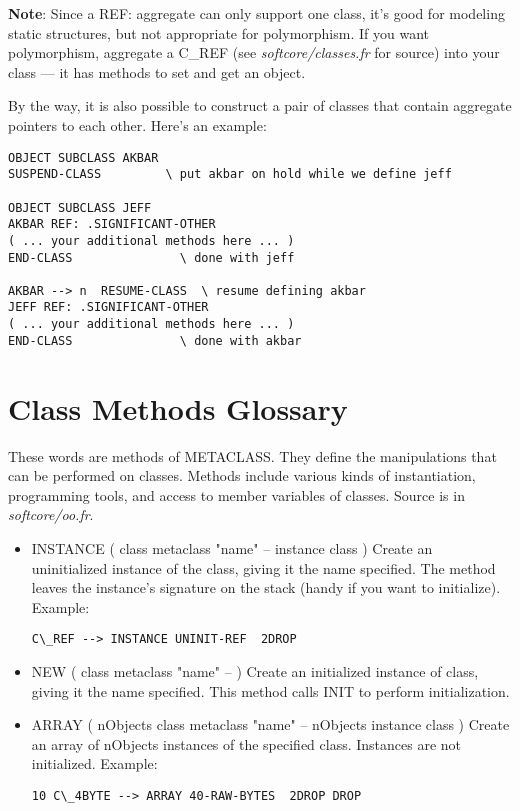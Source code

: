 \begin{;stlisting}[frame=single]
\begin{itemize}[noitemsep]
	\textbf{Note}: Since a REF: aggregate can only support one class,
	it's good for modeling static structures, but not appropriate
	for polymorphism. If you want polymorphism, aggregate a C\_REF
	(see \textit{softcore/classes.fr} for source) into your class —
	it has methods to set and get an object.

	By the way, it is also possible to construct a pair of classes
	that contain aggregate pointers to each other. Here's an example:
\begin{lstlisting}
OBJECT SUBCLASS AKBAR
SUSPEND-CLASS         \ put akbar on hold while we define jeff

OBJECT SUBCLASS JEFF
AKBAR REF: .SIGNIFICANT-OTHER
( ... your additional methods here ... )
END-CLASS               \ done with jeff

AKBAR --> n  RESUME-CLASS  \ resume defining akbar
JEFF REF: .SIGNIFICANT-OTHER
( ... your additional methods here ... )
END-CLASS               \ done with akbar
\end{lstlisting}
\end{itemize}


\section{Class Methods Glossary}
These words are methods of METACLASS. They define the manipulations that
can be performed on classes. Methods include various kinds of
instantiation, programming tools, and access to member variables of
classes. Source is in \textit{softcore/oo.fr}.
\begin{itemize}[noitemsep]
	\item INSTANCE ( class metaclass "name" -- instance
		class )\newline
	Create an uninitialized instance of the class, giving it the
	name specified. The method leaves the instance's signature on
	the stack (handy if you want to initialize). Example:
\begin{lstlisting}[frame=single]
C\_REF --> INSTANCE UNINIT-REF  2DROP
\end{lstlisting}

	\item NEW ( class metaclass "name" -- )\newline
	Create an initialized instance of class, giving it the name
	specified. This method calls INIT to perform initialization.

	\item ARRAY ( nObjects class metaclass "name" -- nObjects
		instance class )\newline
	Create an array of nObjects instances of the specified class.
	Instances are not initialized. Example:
\begin{lstlisting}[frame=single]
10 C\_4BYTE --> ARRAY 40-RAW-BYTES  2DROP DROP
\end{lstlisting}


\end{itemize}
\end{;stlisting}

